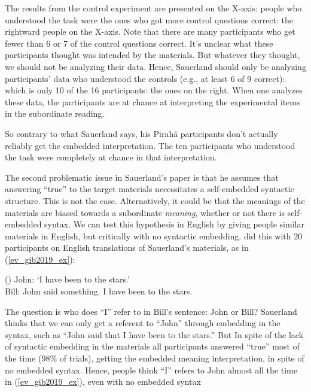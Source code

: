 \documentclass{article}
\newcounter{examplectr}
\newcommand{\exref}[1]{(\ref{#1})}
\newenvironment{myexample}
   { \vspace{20pt}
     \noindent
     \begin{minipage}{\textwidth}    %

     \refstepcounter{examplectr}     %
     (\arabic{examplectr})}%
   { \vspace{20pt}
     \end{minipage}}
\begin{document}
The results from the control experiment are presented on the X-axis:  people who understood the task were the ones who got more control questions correct: the rightward people on the X-axis.  Note that there are many participants who get fewer than 6 or 7 of the control questions correct.  It's unclear what these participants thought was intended by the materials.  But whatever they thought, we should not be analyzing their data. Hence, Sauerland should only be analyzing participants’ data who understood the controls (e.g., at least 6 of 9 correct):  which is only 10 of the 16 participants: the ones on the right. When one analyzes these data, the participants are at chance at interpreting the experimental items in the subordinate reading.

So contrary to what Sauerland says, his Pirahã participants don’t actually reliably get the embedded interpretation. The ten participants who understood the task were completely at chance in that interpretation.

The second problematic issue in Sauerland's paper is that he assumes that answering ``true'' to the target materials necessitates a self-embedded syntactic structure.  This is not the case.  Alternatively, it could be that the meanings of the materials are biased towards a subordinate \textit{meaning}, whether or not there is self-embedded syntax.  We can test this hypothesis in English by giving people similar materials in English, but critically with no syntactic embedding.  \cite{everett2019recursion} did this with 20 participants on English translations of Sauerland's materials, as in \exref{ev_gib2019_ex}: 

\begin{myexample}
\label{ev_gib2019_ex}
John: ‘I have been to the stars.’\\
Bill: John said something. I have been to the stars.
\end{myexample}

The question is who does ``I'' refer to in Bill’s sentence:  John or Bill? Sauerland thinks that we can only get a referent to ``John'' through embedding in the syntax, such as ``John said that I have been to the stars.''  But In spite of the lack of syntactic embedding in the materials all participants answered ``true'' most of the time (98\% of trials), getting the embedded meaning interpretation, in spite of no embedded syntax.  Hence, people think ``I'' refers to John almost all the time in \exref{ev_gib2019_ex}, even with no embedded syntax
\end{document}

